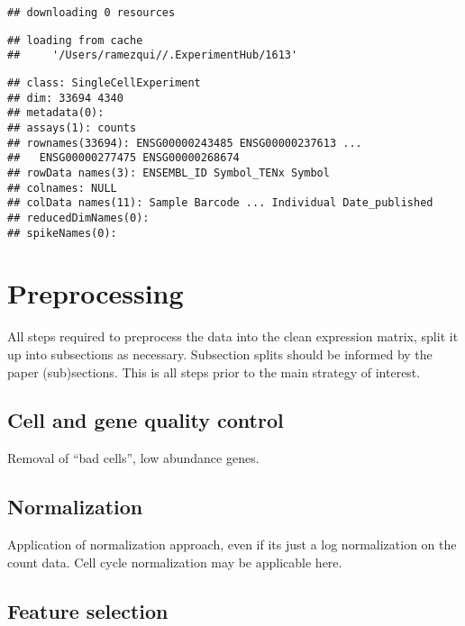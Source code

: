 \documentclass[]{book}
\begin{document}
\begin{verbatim}
## downloading 0 resources
\end{verbatim}

\begin{verbatim}
## loading from cache 
##     '/Users/ramezqui//.ExperimentHub/1613'
\end{verbatim}

\begin{verbatim}
## class: SingleCellExperiment 
## dim: 33694 4340 
## metadata(0):
## assays(1): counts
## rownames(33694): ENSG00000243485 ENSG00000237613 ...
##   ENSG00000277475 ENSG00000268674
## rowData names(3): ENSEMBL_ID Symbol_TENx Symbol
## colnames: NULL
## colData names(11): Sample Barcode ... Individual Date_published
## reducedDimNames(0):
## spikeNames(0):
\end{verbatim}

\hypertarget{preprocessing-1}{%
\section{Preprocessing}\label{preprocessing-1}}

All steps required to preprocess the data into the clean expression matrix, split it up into subsections as necessary. Subsection splits should be informed by the paper (sub)sections. This is all steps prior to the main strategy of interest.

\hypertarget{cell-and-gene-quality-control-1}{%
\subsection{Cell and gene quality control}\label{cell-and-gene-quality-control-1}}

Removal of ``bad cells'', low abundance genes.

\hypertarget{normalization-1}{%
\subsection{Normalization}\label{normalization-1}}

Application of normalization approach, even if its just a log normalization on the count data. Cell cycle normalization may be applicable here.

\hypertarget{feature-selection-1}{%
\subsection{Feature selection}\label{feature-selection-1}}
\end{document}
